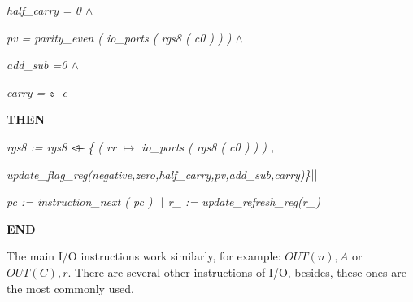 \documentclass[11pt]{article} %
\begin{document}
\hspace*{0.40in}\it half\_carry \rm = \rm 0  $\land$ 

\hspace*{0.40in}\it pv \rm = \it parity\_even \rm ( \it io\_ports \rm ( \it rgs8 \rm ( \it c0 \rm ) \rm ) \rm ) $\land$

\hspace*{0.40in}\it add\_sub \rm =\hspace*{0.10in}\rm 0  $\land$ 

\hspace*{0.40in}\it carry \rm = \it z\_c

\hspace*{0.20in}\bf THEN

\hspace*{0.40in}\it rgs8 \rm := \it rgs8  $\lover$  \rm \{ \rm ( \it rr  $\mapsto$  \it io\_ports \rm ( \it rgs8 \rm ( \it c0 \rm ) \rm ) \rm ) \rm ,

\hspace*{0.40in}\it update\_flag\_reg\rm (\it negative\rm,\it zero\rm,\it half\_carry\rm,\it pv\rm,\it add\_sub\rm,\it carry)\rm\}$\mbox{$\mid\mid$}$

\hspace*{0.40in}\it pc \rm := \it instruction\_next \rm ( \it pc \rm )  $\mbox{$\mid\mid$}$  \it r\_ \rm := \it update\_refresh\_reg\rm (\it r\_\rm )

\hspace*{0.0in}\bf END \rm

The main I/O instructions work similarly, for example: $\mathit{OUT(n),A}$  or
$\mathit{OUT (C ), r}$. There are several other instructions of I/O, besides,
these ones are the most commonly used.
\end{document}
